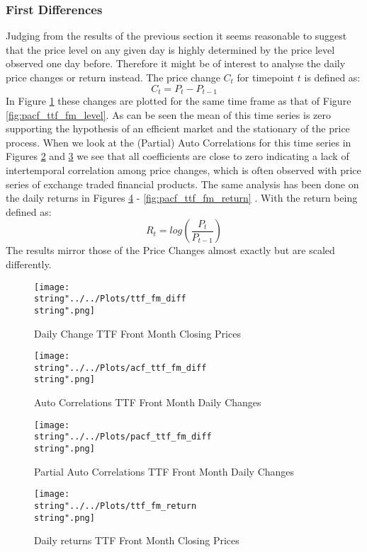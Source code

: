 \subsubsection{First Differences}
Judging from the results of the previous section it seems reasonable to suggest that the price level on any given day is highly determined by the price level observed one day before. Therefore it might be of interest to analyse the daily price changes or return instead. The price change $C_t$ for timepoint $t$ is defined as:
$$C_t = P_t - P_{t-1}$$
In Figure \ref{fig:ttf_fm_diff} these changes are plotted for the same time frame as that of Figure \ref{fig:pacf_ttf_fm_level}. As can be seen the mean of this time series is zero supporting the hypothesis of an efficient market and the stationary of the price process.
When we look at the (Partial) Auto Correlations for this time series in Figures \ref{fig:acf_ttf_fm_diff} and \ref{fig:pacf_ttf_fm_diff} we see that all coefficients are close to zero indicating a lack of intertemporal correlation among price changes, which is often observed with price series of exchange traded financial products.
The same analysis has been done on the daily returns in Figures \ref{fig:ttf_fm_return} - \ref{fig:pacf_ttf_fm_return} . With the return being defined as:
$$R_t = log(\frac{P_t}{P_{t-1}})$$
The results mirror those of the Price Changes almost exactly but are scaled differently.
\begin{figure}
  \centering
\texttt{[image: \\string"../../Plots/ttf\_fm\_diff\\string".png]}
  \caption{Daily Change TTF Front Month Closing Prices}\label{fig:ttf_fm_diff}
\end{figure}

\begin{figure}
  \centering
\texttt{[image: \\string"../../Plots/acf\_ttf\_fm\_diff\\string".png]}
  \caption{Auto Correlations TTF Front Month Daily Changes}\label{fig:acf_ttf_fm_diff}
\end{figure}

\begin{figure}
  \centering
\texttt{[image: \\string"../../Plots/pacf\_ttf\_fm\_diff\\string".png]}
  \caption{Partial Auto Correlations TTF Front Month Daily Changes}\label{fig:pacf_ttf_fm_diff}
\end{figure}

\begin{figure}
  \centering
\texttt{[image: \\string"../../Plots/ttf\_fm\_return\\string".png]}
  \caption{Daily returns TTF Front Month Closing Prices}\label{fig:ttf_fm_return}
\end{figure}


